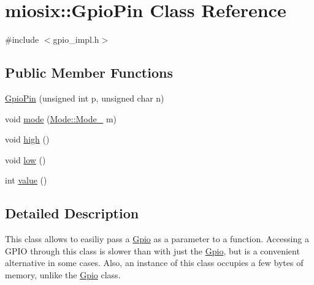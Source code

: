 \hypertarget{classmiosix_1_1_gpio_pin}{\section{miosix\-:\-:Gpio\-Pin Class Reference}
\label{classmiosix_1_1_gpio_pin}
}


{\ttfamily \#include $<$gpio\-\_\-impl.\-h$>$}

\subsection*{Public Member Functions}
\begin{DoxyCompactItemize}
\item 
\hyperlink{classmiosix_1_1_gpio_pin_accbfceca6e662aa669141d96020887ea}{Gpio\-Pin} (unsigned int p, unsigned char n)
\item 
void \hyperlink{classmiosix_1_1_gpio_pin_a6c57f8f1635a5e7b7cf44f5a84969197}{mode} (\hyperlink{classmiosix_1_1_mode_a481b1664f08bbe862f80be59ab0ffcf9}{Mode\-::\-Mode\-\_\-} m)
\item 
void \hyperlink{classmiosix_1_1_gpio_pin_a48fd3032da8350f99932945f899bc707}{high} ()
\item 
void \hyperlink{classmiosix_1_1_gpio_pin_ae1ea6bc05084b9503794f54367a75918}{low} ()
\item 
int \hyperlink{classmiosix_1_1_gpio_pin_adb477cb8905fc0661bff99f0cc3d8865}{value} ()
\end{DoxyCompactItemize}


\subsection{Detailed Description}
This class allows to easiliy pass a \hyperlink{classmiosix_1_1_gpio}{Gpio} as a parameter to a function. Accessing a G\-P\-I\-O through this class is slower than with just the \hyperlink{classmiosix_1_1_gpio}{Gpio}, but is a convenient alternative in some cases. Also, an instance of this class occupies a few bytes of memory, unlike the \hyperlink{classmiosix_1_1_gpio}{Gpio} class. 

